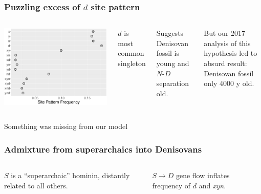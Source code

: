 \documentclass[pdftex,12pt]{beamer}
\begin{document}
\begin{frame}
  \frametitle{Puzzling excess of $d$ site pattern}
  \begin{columns}
    \includegraphics[width=\linewidth]{xynd-frq.pdf}
      \raggedleft

      $d$ is most common singleton

      \bigskip

      Suggests Denisovan fossil is young and $N$-$D$ separation old.

      \bigskip

      But our 2017 analysis of this hypothesis led to absurd result:
      Denisovan fossil only 4000 y old.
  \end{columns}

  \bigskip\raggedleft
      
  Something was missing from our model
\end{frame}

\begin{frame}
  \frametitle{Admixture from superarchaics into Denisovans}
  \begin{columns}
    
    \raggedleft
    $S$ is a ``superarchaic'' hominin, distantly related to all
    others.

    \bigskip

    $S{\rightarrow}D$ gene flow inflates frequency of $d$ and
    \textit{xyn}. 
  \end{columns}
\end{frame}
\end{document}
